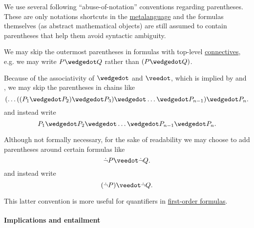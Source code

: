 \begin{remark}\label{rem:propositional_formula_parentheses}
  We use several following \enquote{abuse-of-notation} conventions regarding parentheses. These are only notations shortcuts in the \hyperref[rem:metalogic]{metalanguage} and the formulas themselves (as abstract mathematical objects) are still assumed to contain parentheses that help them avoid syntactic ambiguity.

  \begin{thmenum}
     We may skip the outermost parentheses in formulas with top-level \hyperref[def:propositional_alphabet/connectives]{connectives}, e.g. we may write \( P \synwedge Q \) rather than \( (P \synwedge Q) \).

     Because of the associativity of \( \synwedge \) and \( \synvee \), which is implied by  and , we may skip the parentheses in chains like
    \begin{equation*}
      ( \ldots ((P_1 \synwedge P_2) \synwedge P_3) \synwedge \ldots \synwedge P_{n-1} ) \synwedge P_n.
    \end{equation*}
    and instead write
    \begin{equation*}
      P_1 \synwedge P_2 \synwedge \ldots \synwedge P_{n-1} \synwedge P_n.
    \end{equation*}

     Although not formally necessary, for the sake of readability we may choose to add parentheses around certain formulas like
    \begin{equation*}
      \synneg P \synvee \synneg Q.
    \end{equation*}
    and instead write
    \begin{equation*}
      (\synneg P) \synvee \synneg Q.
    \end{equation*}

    This latter convention is more useful for quantifiers in \hyperref[def:first_order_syntax/formula]{first-order formulas}.
  \end{thmenum}
\end{remark}

\paragraph{Implications and entailment}

